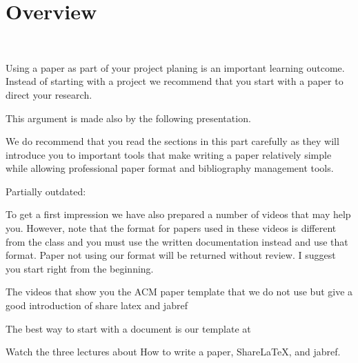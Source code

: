 \section{Overview}\label{C:overview-doc}

\FILENAME\

Using a paper as part of your project planing is an important learning
outcome. Instead of starting with a project we recommend that you
start with a paper to direct your research.

This argument is made also by the following presentation.


We do recommend that you read the sections in this part carefully as they will introduce you to important tools that make writing a paper relatively simple while allowing professional paper format and bibliography management tools.

\begin{WARNING} 

Partially outdated:

To get a first impression we have also prepared a number of videos that may help you. However, note that the format for papers used in these videos is different from the class and you must use the written documentation instead and use that format. Paper not using our format will be returned without review. I suggest you start right from the beginning.

The videos that show you the ACM paper template that we do not use but
give a good introduction of share latex and jabref



\end{WARNING}

The best way to start with a document is our template at 


\begin{exercise}\label{E:Documentation.1}
Watch the three lectures about How to write a paper, ShareLaTeX, and jabref.
\end{exercise}